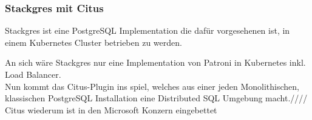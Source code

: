 \subsubsection{Stackgres mit Citus}
\begin{flushleft} 
Stackgres ist eine PostgreSQL Implementation die dafür vorgesehenen ist, in einem Kubernetes Cluster betrieben zu werden.
\end{flushleft} 
\begin{flushleft}
An sich wäre Stackgres nur eine Implementation von Patroni in Kubernetes inkl. Load Balancer.\\
Nun kommt das Citus-Plugin ins spiel, welches aus einer jeden Monolithischen, klassischen PostgreSQL Installation eine Distributed SQL Umgebung macht.////
Citus wiederum ist in den Microsoft Konzern eingebettet
\end{flushleft}

